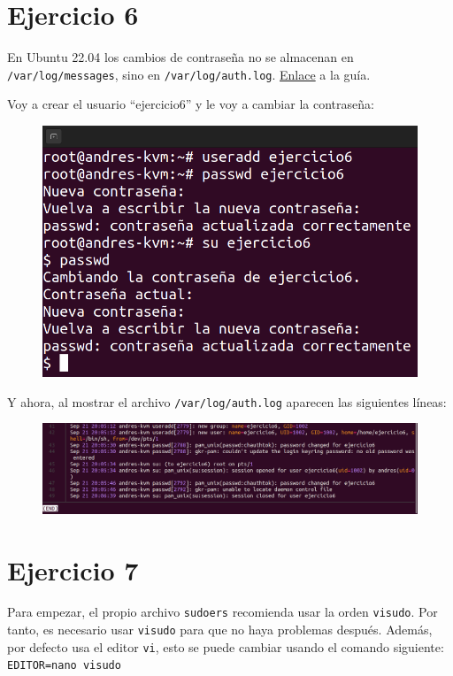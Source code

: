 \documentclass{article}
\begin{document}
\section*{Ejercicio 6}
En Ubuntu 22.04 los cambios de contraseña no se almacenan en \verb|/var/log/messages|, sino en \verb|/var/log/auth.log|. \href{https://ubuntu.com/tutorials/viewing-and-monitoring-log-files#2-log-files-locations}{Enlace} a la guía.

\bigskip

Voy a crear el usuario ``ejercicio6'' y le voy a cambiar la contraseña:

\begin{figure}[H]
    \includegraphics[width=\textwidth]{imagenes/createejercicio6.png}
\end{figure}

Y ahora, al mostrar el archivo \verb|/var/log/auth.log| aparecen las siguientes líneas:

\begin{figure}[H]
    \includegraphics[width=\textwidth]{imagenes/authcreateejercicio6.png}
\end{figure}

\newpage

\section*{Ejercicio 7}
Para empezar, el propio archivo \verb|sudoers| recomienda usar la orden \verb|visudo|. Por tanto, es necesario usar \verb|visudo| para que no haya problemas después. Además, por defecto usa el editor \verb|vi|, esto se puede cambiar usando el comando siguiente: \verb|EDITOR=nano visudo|
\end{document}
